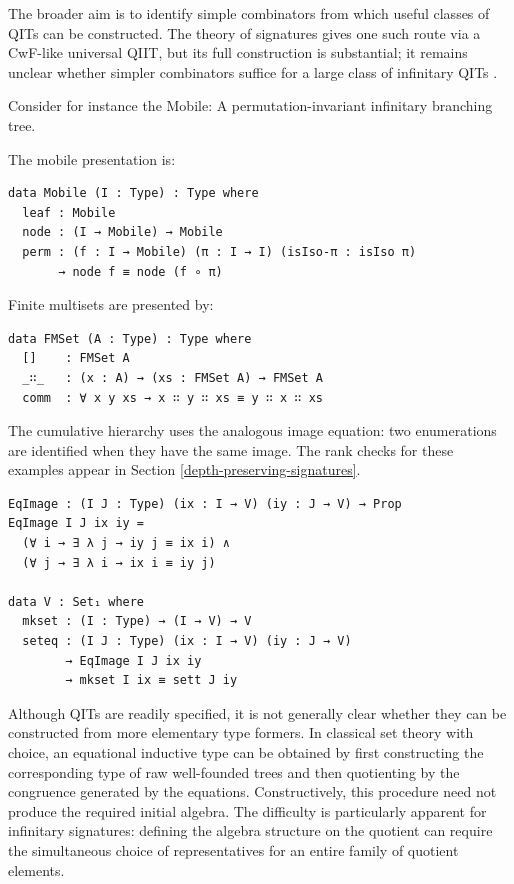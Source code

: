 \documentclass[runningheads]{llncs}
\begin{document}
The broader aim is to identify simple combinators from which useful
classes of QITs can be constructed. The theory of signatures gives one
such route via a CwF-like universal QIIT, but its full construction is
substantial; it remains unclear whether simpler combinators suffice for a
large class of infinitary QITs
\citep{kaposi2019-constructing-qiit,kovacs2020-infinitary-qiit}.

Consider for instance the Mobile: A permutation-invariant infinitary
branching tree.

The mobile presentation is:

\begin{Verbatim}[frame=single,breaklines=true,fontsize=\scriptsize]
data Mobile (I : Type) : Type where
  leaf : Mobile
  node : (I → Mobile) → Mobile
  perm : (f : I → Mobile) (π : I → I) (isIso-π : isIso π)
       → node f ≡ node (f ∘ π)
\end{Verbatim}

Finite multisets are presented by:

\begin{Verbatim}[frame=single,breaklines=true,fontsize=\scriptsize]
data FMSet (A : Type) : Type where
  []    : FMSet A
  _∷_   : (x : A) → (xs : FMSet A) → FMSet A
  comm  : ∀ x y xs → x ∷ y ∷ xs ≡ y ∷ x ∷ xs
\end{Verbatim}

The cumulative hierarchy uses the analogous image equation: two
enumerations are identified when they have the same image. The rank
checks for these examples appear in Section \ref{depth-preserving-signatures}. %

\begin{Verbatim}[frame=single,breaklines=true,fontsize=\scriptsize]
EqImage : (I J : Type) (ix : I → V) (iy : J → V) → Prop
EqImage I J ix iy =
  (∀ i → ∃ λ j → iy j ≡ ix i) ∧
  (∀ j → ∃ λ i → ix i ≡ iy j)

data V : Set₁ where
  mkset : (I : Type) → (I → V) → V
  seteq : (I J : Type) (ix : I → V) (iy : J → V)
        → EqImage I J ix iy
        → mkset I ix ≡ sett J iy
\end{Verbatim}


Although QITs are readily specified, it is not generally clear whether
they can be constructed from more elementary type formers. In classical
set theory with choice, an equational inductive type can be obtained by first
constructing the corresponding type of raw well-founded trees and then
quotienting by the congruence generated by the
equations. Constructively, this procedure need not
produce the required initial algebra. The difficulty is particularly
apparent for infinitary signatures: defining the algebra structure on
the quotient can require the simultaneous choice of representatives for
an entire family of quotient elements.
\end{document}
